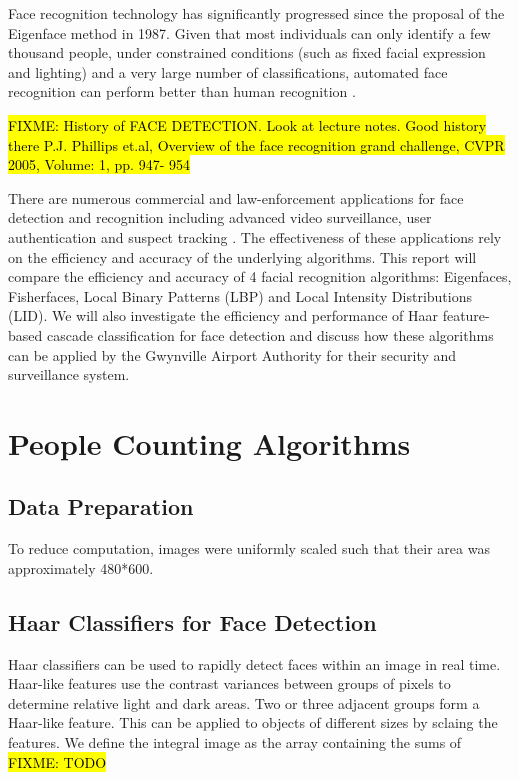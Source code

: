 \documentclass{article}
\begin{document}
Face recognition technology has significantly progressed since the proposal of the Eigenface method in 1987. Given that most individuals can only identify a few thousand people, under constrained conditions (such as fixed facial expression and lighting) and a very large number of classifications, automated face recognition can perform better than human recognition \cite{li2011handbook}.

\hl{FIXME: History of FACE DETECTION. Look at lecture notes. Good history there P.J. Phillips et.al, Overview of the face recognition grand challenge, CVPR 2005, Volume: 1, pp. 947- 954 }

There are numerous commercial and law-enforcement applications for face detection and recognition including advanced video surveillance, user authentication and suspect tracking \cite{zhao2003face}. The effectiveness of these applications rely on the efficiency and accuracy of the underlying algorithms. This report will compare the efficiency and accuracy of 4 facial recognition algorithms: Eigenfaces, Fisherfaces, Local Binary Patterns (LBP) and Local Intensity Distributions (LID). We will also investigate the efficiency and performance of Haar feature-based cascade classification for face detection and discuss how these algorithms can be applied by the Gwynville Airport Authority for their security and surveillance system.



\section{People Counting Algorithms}
\subsection{Data Preparation}
To reduce computation, images were uniformly scaled such that their area was approximately 480*600.

\subsection{Haar Classifiers for Face Detection}
Haar classifiers can be used to rapidly detect faces within an image in real time. Haar-like features use the contrast variances between groups of pixels to determine relative light and dark areas. Two or three adjacent groups form a Haar-like feature. This can be applied to objects of different sizes by sclaing the features.
We define the integral image as the array containing the sums of \hl{FIXME: TODO}
\end{document}
